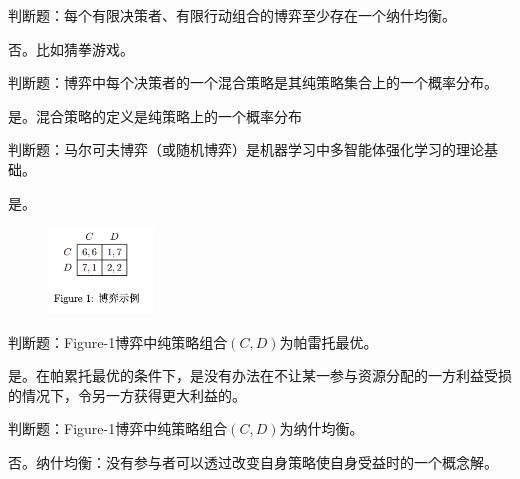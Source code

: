 \begin{problem}
	判断题：每个有限决策者、有限行动组合的博弈至少存在一个纳什均衡。
\end{problem}
\begin{solution}
	否。比如猜拳游戏。
\end{solution}



\begin{problem}
	判断题：博弈中每个决策者的一个混合策略是其纯策略集合上的一个概率分布。
\end{problem}
\begin{solution}
	是。混合策略的定义是纯策略上的一个概率分布
\end{solution}



\begin{problem}
	判断题：马尔可夫博弈（或随机博弈）是机器学习中多智能体强化学习的理论基础。
\end{problem}
\begin{solution}
	是。
\end{solution}

\begin{figure}[htbp]
	\centering\label{fig:1}
	\includegraphics[width=0.25\textwidth]{./figure/fig1.png}
\end{figure}



\begin{problem}
	判断题：Figure-1博弈中纯策略组合$(C,D)$为帕雷托最优。
\end{problem}
\begin{solution}
	是。在帕累托最优的条件下，是没有办法在不让某一参与资源分配的一方利益受损的情况下，令另一方获得更大利益的。
	
\end{solution}



\begin{problem}
	判断题：Figure-1博弈中纯策略组合$(C,D)$为纳什均衡。
\end{problem}
\begin{solution}
	否。纳什均衡：没有参与者可以透过改变自身策略使自身受益时的一个概念解。
\end{solution}


